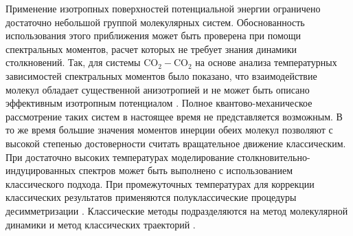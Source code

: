Применение изотропных поверхностей потенциальной энергии ограничено достаточно небольшой группой молекулярных систем. Обоснованность использования этого приближения может быть проверена при помощи спектральных моментов, расчет которых не требует знания динамики столкновений. Так, для системы CO$_2-$CO$_2$ на основе анализа температурных зависимостей спектральных моментов было показано, что взаимодействие молекул обладает существенной анизотропией и не может быть описано эффективным изотропным потенциалом \cite{gruszka1996}. Полное квантово-механическое рассмотрение таких систем в настоящее время не представляется возможным. В то же время большие значения моментов инерции обеих молекул позволяют с высокой степенью достоверности считать вращательное движение классическим. При достаточно высоких температурах моделирование столкновительно-индуцированных спектров может быть выполнено с использованием классического подхода. При промежуточных температурах для коррекции классических результатов применяются полуклассические процедуры десимметризации \cite{frommhold}. Классические методы подразделяются на метод молекулярной динамики \cite{gruszka1996, bussery2014} и метод классических траекторий \cite{oparin2017}. 

